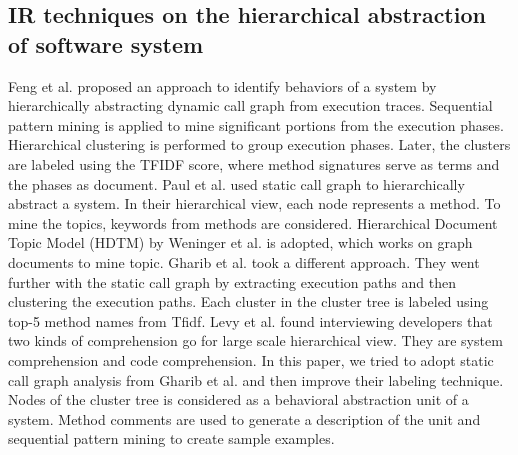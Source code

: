 \subsection{IR techniques on the hierarchical abstraction of software system}
Feng et al. \cite{feng2018hierarchicalExecutionComprehension} proposed an approach to identify behaviors of a system by hierarchically abstracting dynamic call graph from execution traces. Sequential pattern mining is applied to mine significant portions from the execution phases. Hierarchical clustering is performed to group execution phases. Later, the clusters are labeled using the TFIDF score, where method signatures serve as terms and the phases as document. 
Paul et al. \cite{mcburney2014improvingTopicSummarize} used static call graph to hierarchically abstract a system. In their hierarchical view, each node represents a method. To mine the topics, keywords from methods are considered. Hierarchical Document Topic Model (HDTM) by \cite{weninger2012documentTopicHierarchies} Weninger et al. is adopted, which works on graph documents to mine topic. Gharib et al. \cite{gharibi2018automaticStaticCluster} took a different approach. They went further with the static call graph by extracting execution paths and then clustering the execution paths. Each cluster in the cluster tree is labeled using top-5 method names from Tfidf. Levy et al. \cite{levy2019understandingLargeHierarchical} found interviewing developers that two kinds of comprehension go for large scale hierarchical view. They are system comprehension and code comprehension. In this paper, we tried to adopt static call graph analysis from Gharib et al. and then improve their labeling technique. Nodes of the cluster tree is considered as a behavioral abstraction unit of a system. Method comments are used to generate a description of the unit and sequential pattern mining to create sample examples. 

